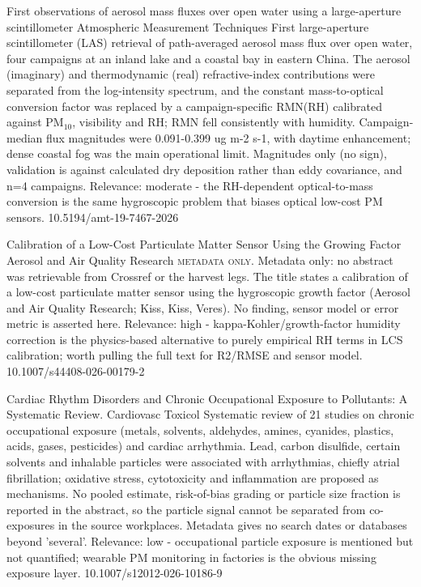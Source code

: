 \documentclass[10pt]{article}
\begin{document}
{First observations of aerosol mass fluxes over open water using a large-aperture scintillometer}
{Atmospheric Measurement Techniques}
{First large-aperture scintillometer (LAS) retrieval of path-averaged aerosol mass flux over open water, four campaigns at an inland lake and a coastal bay in eastern China. The aerosol (imaginary) and thermodynamic (real) refractive-index contributions were separated from the log-intensity spectrum, and the constant mass-to-optical conversion factor was replaced by a campaign-specific RMN(RH) calibrated against PM$_{10}$, visibility and RH; RMN fell consistently with humidity. Campaign-median flux magnitudes were 0.091-0.399 ug m-2 s-1, with daytime enhancement; dense coastal fog was the main operational limit. Magnitudes only (no sign), validation is against calculated dry deposition rather than eddy covariance, and n=4 campaigns. Relevance: moderate - the RH-dependent optical-to-mass conversion is the same hygroscopic problem that biases optical low-cost PM sensors.}
{10.5194/amt-19-7467-2026}

{Calibration of a Low-Cost Particulate Matter Sensor Using the Growing Factor}
{Aerosol and Air Quality Research}
{\textsc{metadata only.} Metadata only: no abstract was retrievable from Crossref or the harvest legs. The title states a calibration of a low-cost particulate matter sensor using the hygroscopic growth factor (Aerosol and Air Quality Research; Kiss, Kiss, Veres). No finding, sensor model or error metric is asserted here. Relevance: high - kappa-Kohler/growth-factor humidity correction is the physics-based alternative to purely empirical RH terms in LCS calibration; worth pulling the full text for R2/RMSE and sensor model.}
{10.1007/s44408-026-00179-2}

\par{}\baselineskip{}\baselineskip
{}

{Cardiac Rhythm Disorders and Chronic Occupational Exposure to Pollutants: A Systematic Review.}
{Cardiovasc Toxicol}
{Systematic review of 21 studies on chronic occupational exposure (metals, solvents, aldehydes, amines, cyanides, plastics, acids, gases, pesticides) and cardiac arrhythmia. Lead, carbon disulfide, certain solvents and inhalable particles were associated with arrhythmias, chiefly atrial fibrillation; oxidative stress, cytotoxicity and inflammation are proposed as mechanisms. No pooled estimate, risk-of-bias grading or particle size fraction is reported in the abstract, so the particle signal cannot be separated from co-exposures in the source workplaces. Metadata gives no search dates or databases beyond 'several'. Relevance: low - occupational particle exposure is mentioned but not quantified; wearable PM monitoring in factories is the obvious missing exposure layer.}
{10.1007/s12012-026-10186-9}
\end{document}
